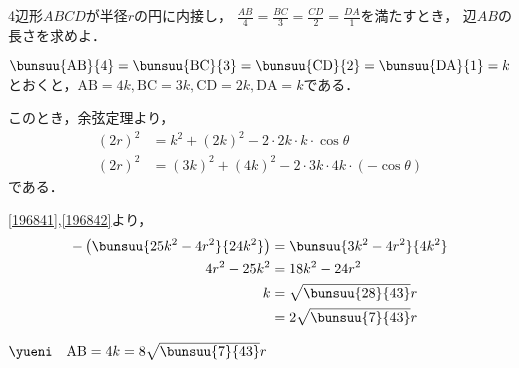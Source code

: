 \begin{problem}
4辺形$ABCD$が半径$r$の円に内接し，
$\displaystyle\frac{AB}{4}=\frac{BC}{3}=\frac{CD}{2}=\frac{DA}{1}$を満たすとき，
辺$AB$の長さを求めよ．
\end{problem}

$\bunsuu{\mathrm{AB}}{4} = \bunsuu{\mathrm{BC}}{3} = \bunsuu{\mathrm{CD}}{2} = \bunsuu{\mathrm{DA}}{1} = k$とおくと，$\mathrm{AB} = 4k, \mathrm{BC} = 3k, \mathrm{CD} = 2k, \mathrm{DA} = k$である．

このとき，余弦定理より，
\begin{align}
    (2r)^2 &= k^2 + (2k)^2 - 2 \cdot 2k \cdot k \cdot \cos\theta \label{196841}\\
    (2r)^2 &= (3k)^2 + (4k)^2 - 2 \cdot 3k \cdot 4k \cdot (-\cos\theta) \label{196842}
\end{align}
である．

\eqref{196841},\eqref{196842}より，
\begin{align*}
    -\left(\bunsuu{25k^2 - 4r^2}{24k^2}\right) &= \bunsuu{3k^2-4r^2}{4k^2}\\
    4r^2 - 25k^2 &= 18k^2 - 24 r^2\\
    k &= \sqrt{\bunsuu{28}{43}}r\\
    &= 2\sqrt{\bunsuu{7}{43}}r
\end{align*}

$\yueni\quad\mathrm{AB} = 4k = 8\sqrt{\bunsuu{7}{43}}r$
